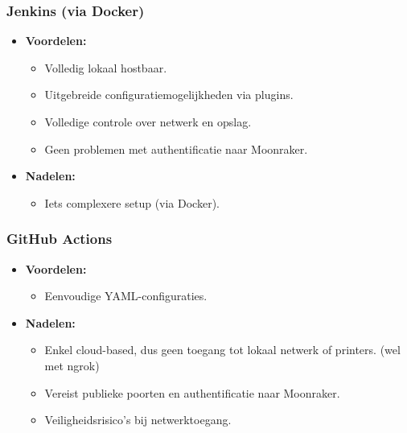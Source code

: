 \subsubsection{Jenkins (via Docker)}
\begin{itemize}
    \item \textbf{Voordelen:}
    \begin{itemize}
        \item Volledig lokaal hostbaar.
        \item Uitgebreide configuratiemogelijkheden via plugins.
        \item Volledige controle over netwerk en opslag.
        \item Geen problemen met authentificatie naar Moonraker.
    \end{itemize}
    \item \textbf{Nadelen:}
    \begin{itemize}
        \item Iets complexere setup (via Docker).
    \end{itemize}
\end{itemize}

\subsubsection{GitHub Actions}
\begin{itemize}
    \item \textbf{Voordelen:}
    \begin{itemize}
        \item Eenvoudige YAML-configuraties.
    \end{itemize}
    \item \textbf{Nadelen:}
    \begin{itemize}
        \item Enkel cloud-based, dus geen toegang tot lokaal netwerk of printers. (wel met ngrok)
        \item Vereist publieke poorten en authentificatie naar Moonraker.
        \item Veiligheidsrisico’s bij netwerktoegang.
    \end{itemize}
\end{itemize}

